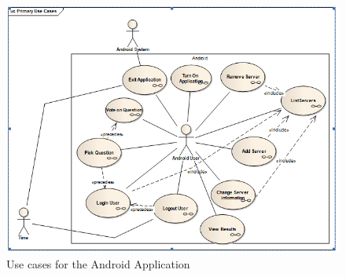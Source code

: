 \documentclass[11pt,twoside,a4paper]{book}
\begin{document}
\begin{figure}[h]
\begin{center}
\includegraphics[scale=1]{figures/AndroidUCs.PNG} 
\caption{Use cases for the Android Application}
\label{fig:Use Cases}
\end{center}
\end{figure}
\end{document}
